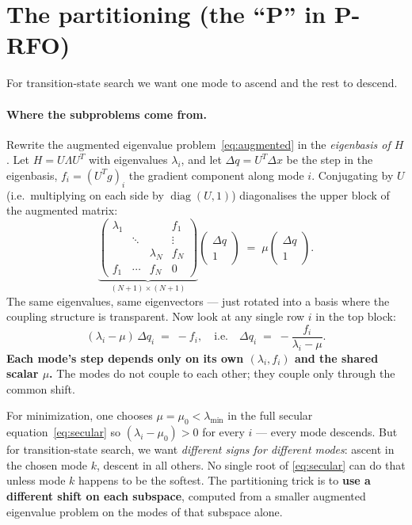 \documentclass[11pt]{article}
\newcommand{\dx}{\Delta x}
\newcommand{\dq}{\Delta q}
\begin{document}
\section{The partitioning (the ``P'' in P-RFO)}

For transition-state search we want one mode to ascend and the rest to descend.

\paragraph{Where the subproblems come from.}
Rewrite the augmented eigenvalue problem~\eqref{eq:augmented} in the
\emph{eigenbasis of $H$}.  Let $H = U \Lambda U^T$ with eigenvalues
$\lambda_i$, and let $\dq = U^T \dx$ be the step in the eigenbasis,
$f_i = (U^T g)_i$ the gradient component along mode $i$.  Conjugating by
$U$ (i.e.\ multiplying on each side by $\operatorname{diag}(U, 1)$) diagonalises
the upper block of the augmented matrix:
\begin{equation}\label{eq:augmented-eigbasis}
  \underbrace{\begin{pmatrix}
    \lambda_1 &        &              & f_1   \\
              & \ddots &              & \vdots\\
              &        & \lambda_N    & f_N   \\
    f_1       & \cdots & f_N          & 0
  \end{pmatrix}}_{(N+1) \times (N+1)}
  \begin{pmatrix} \dq \\ 1 \end{pmatrix}
  \;=\; \mu \begin{pmatrix} \dq \\ 1 \end{pmatrix}.
\end{equation}
The same eigenvalues, same eigenvectors --- just rotated into a basis where
the coupling structure is transparent.  Now look at any single row $i$ in
the top block:
\begin{equation}\label{eq:per-mode-step}
  (\lambda_i - \mu)\, \dq_i \;=\; -f_i,
  \quad\text{i.e.}\quad
  \dq_i \;=\; -\frac{f_i}{\lambda_i - \mu}.
\end{equation}
\textbf{Each mode's step depends only on its own $(\lambda_i, f_i)$ and the
shared scalar $\mu$.}  The modes do not couple to each other; they couple
only through the common shift.

For minimization, one chooses $\mu = \mu_0 < \lambda_{\min}$ in the full
secular equation~\eqref{eq:secular} so $(\lambda_i - \mu_0) > 0$ for every
$i$ --- every mode descends.  But for transition-state search, we want
\emph{different signs for different modes}: ascent in the chosen mode $k$,
descent in all others.  No single root of \eqref{eq:secular} can do that
unless mode $k$ happens to be the softest.  The partitioning trick is to
\textbf{use a different shift on each subspace}, computed from a smaller
augmented eigenvalue problem on the modes of that subspace alone.
\end{document}
